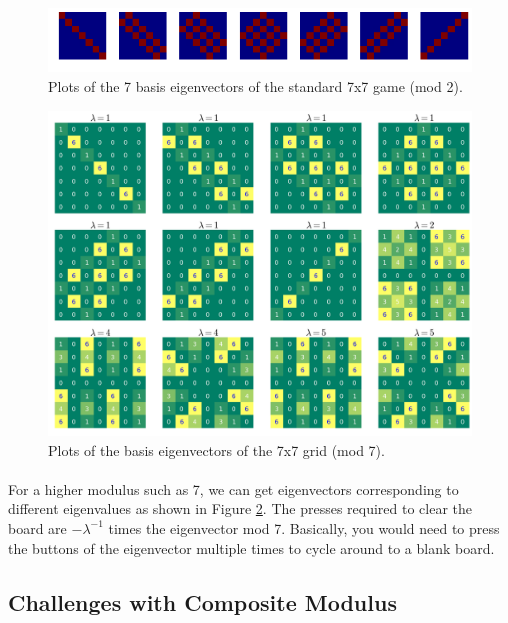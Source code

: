 \documentclass[11pt]{article}
\begin{document}
\begin{figure}[H]
\caption{Plots of the 7 basis eigenvectors of the standard 7x7 game (mod 2).}
\label{eigbasis77}
\includegraphics[width=\textwidth]{eigbasis77.png}
\end{figure}


\begin{figure}[H]
\caption{Plots of the basis eigenvectors of the 7x7 grid (mod 7).}
\label{eig777all}
\includegraphics[width=\textwidth]{eig777all.png}
\end{figure}

\paragraph{} For a higher modulus such as 7, we can get eigenvectors corresponding to different eigenvalues as shown in Figure \ref{eig777all}.  The presses required to clear the board are $-\lambda^{-1}$ times the eigenvector mod 7.  Basically, you would need to press the buttons of the eigenvector multiple times to cycle around to a blank board.

\subsection*{Challenges with Composite Modulus}
\end{document}
